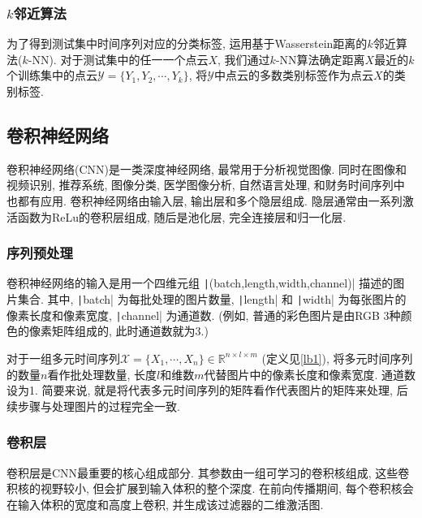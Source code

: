 \documentclass[12pt]{ctexart}
\begin{document}
\subsubsection{$k$邻近算法}
为了得到测试集中时间序列对应的分类标签, 运用基于Wasserstein距离的$k$邻近算法($k$-NN). 对于测试集中的任一一个点云$X$, 我们通过$k$-NN算法确定距离$X$最近的$k$个训练集中的点云$\mathcal{Y}=\{Y_{1},Y_{2},\cdots,Y_{k}\}$, 将$\mathcal{Y}$中点云的多数类别标签作为点云$X$的类别标签.


\subsection{卷积神经网络}
\label{lb4}
卷积神经网络(CNN)是一类深度神经网络, 最常用于分析视觉图像. 同时在图像和视频识别, 推荐系统, 图像分类, 医学图像分析, 自然语言处理, 和财务时间序列中也都有应用.
卷积神经网络由输入层, 输出层和多个隐层组成. 隐层通常由一系列激活函数为ReLu的卷积层组成, 随后是池化层, 完全连接层和归一化层.

\subsubsection{序列预处理}

卷积神经网络的输入是用一个四维元组 \texttt|(batch,length,width,channel)| 描述的图片集合. 其中, \texttt|batch| 为每批处理的图片数量, \texttt|length| 和 \texttt|width| 为每张图片的像素长度和像素宽度, \texttt|channel| 为通道数. (例如, 普通的彩色图片是由RGB 3种颜色的像素矩阵组成的, 此时通道数就为3.)

 对于一组多元时间序列$\mathcal{X}=\{X_{1},\cdots,X_{n}\}\in \mathbb{R}^{n × l × m}$ (定义见\ref{lb1}), 将多元时间序列的数量$n$看作批处理数量, 长度$l$和维数$m$代替图片中的像素长度和像素宽度. 通道数设为1. 简要来说, 就是将代表多元时间序列的矩阵看作代表图片的矩阵来处理\cite{ref29}, 后续步骤与处理图片的过程完全一致.

\subsubsection{卷积层}
卷积层是CNN最重要的核心组成部分. 其参数由一组可学习的卷积核组成, 这些卷积核的视野较小, 但会扩展到输入体积的整个深度. 在前向传播期间, 每个卷积核会在输入体积的宽度和高度上卷积, 并生成该过滤器的二维激活图. 
\end{document}
